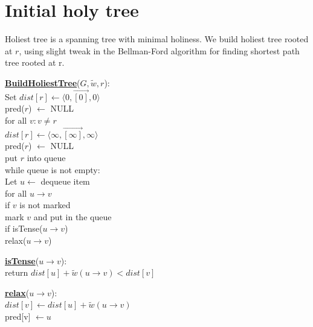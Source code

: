\documentclass{article}
\begin{document}
\section{Initial holy tree}

Holiest tree is a spanning tree with minimal holiness. We build holiest tree 
rooted at $r$, using slight tweak in the Bellman-Ford algorithm for finding 
shortest path tree rooted at r. \\

\begin{minipage}[t]{0.48\linewidth}
\begin{algorithm}
\textbf{\underline{BuildHoliestTree}}($G, \tilde w , r$): \\ \quad
Set $dist[r] \leftarrow \langle 0, \vec{[0]}, 0 \rangle$ \\ \quad \quad
    pred($r$) $\leftarrow$ NULL \\ \quad
for all $v : v \neq r$ \\ \quad \quad
    $dist[r] \leftarrow \langle \infty, \vec{[\infty]}, \infty \rangle$ \\ \quad \quad
    pred($r$) $\leftarrow$ NULL \\ \quad
put $r$ into queue \\ \quad
while queue is not empty: \\ \quad \quad
    Let $u \leftarrow$ dequeue item \\ \quad \quad
    for all $u \rightarrow v$ \\ \qquad \quad
        if $v$ is not marked \\ \quad \qquad \quad
           mark $v$ and put in the queue \\ \qquad \quad
        if isTense($u \rightarrow v$) \\ \quad \qquad \quad
           relax($u \rightarrow v$)
\end{algorithm}
\end{minipage}
\hfill%
\hspace{-4cm}
\begin{minipage}[t]{0.48\linewidth}
\begin{algorithm}
\textbf{\underline{isTense}}($u \rightarrow v$): \\ \quad
return $dist[u] + \tilde w(u \rightarrow v) < dist[v]$ \\

\end{algorithm}

\vspace{0.5cm}

\begin{algorithm}
\textbf{\underline{relax}}($u \rightarrow v$): \\ \quad
$dist[v] \leftarrow dist[u] + \tilde w(u \rightarrow v)$ \\ \quad
pred[v] $\leftarrow u$ \\
\end{algorithm}
\end{minipage}
\end{document}
